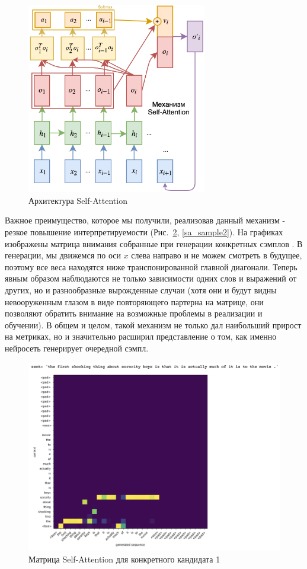\documentclass{spbau-diploma}
\begin{document}
\begin{figure}[h]
\centering
\includegraphics[width=0.7\textwidth]{images/self_attention.png}
\caption{Архитектура Self-Attention}
\label{self_attention}
\end{figure}

Важное преимущество, которое мы получили, реализовав данный механизм - резкое
повышение интерпретируемости (Рис.~\ref{sa_sample1}, \ref{sa_sample2}). На 
графиках изображены матрица внимания собранные при генерации конкретных сэмплов
. В генерации, мы движемся по оси $x$ слева направо и не можем смотреть в 
будущее, поэтому все веса находятся ниже транспонированной главной диагонали. 
Теперь явным образом наблюдаются не только зависимости одних слов и выражений 
от других, но и разнообразные вырожденные случаи (хотя они и будут видны 
невооруженным глазом в виде повторяющего партерна на матрице, они позволяют 
обратить внимание на возможные проблемы в реализации и обучении). В общем и 
целом, такой механизм не только дал наибольший прирост на метриках, но и 
значительно расширил представление о том, как именно нейросеть генерирует
очередной сэмпл.

\begin{figure}[h]
\centering
\includegraphics[width=\textwidth]{images/sa_sample1.png}
\caption{Матрица Self-Attention для конкретного кандидата 1}
\label{sa_sample1}
\end{figure}
\end{document}

